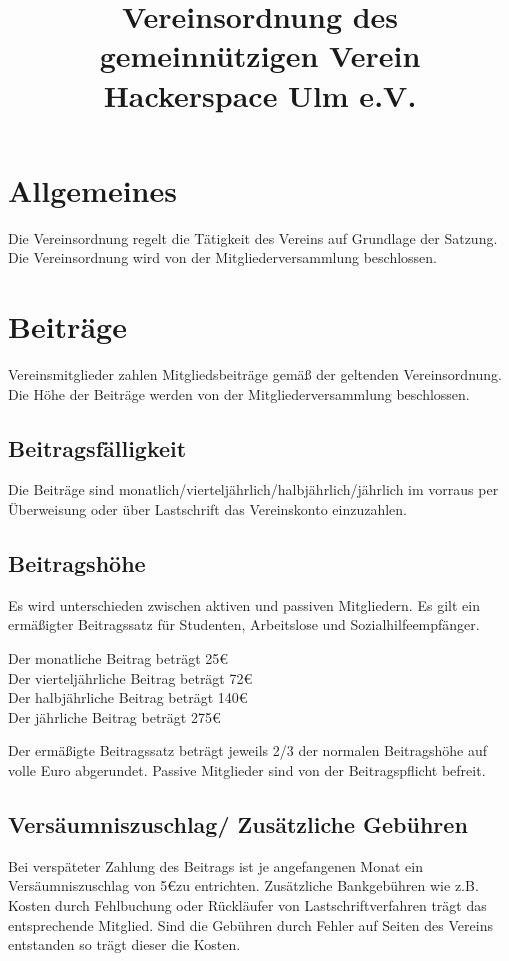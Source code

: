 \documentclass[a4paper, 12pt]{scrartcl}
\title{Vereinsordnung des gemeinnützigen Verein Hackerspace Ulm e.V. }
\author{}
\begin{document}
\maketitle
\sffamily

\section{Allgemeines}
Die Vereinsordnung regelt die Tätigkeit des Vereins auf Grundlage der Satzung. Die Vereinsordnung wird von der Mitgliederversammlung beschlossen. 

\section{Beiträge}
Vereinsmitglieder zahlen Mitgliedsbeiträge gemäß der geltenden Vereinsordnung. Die Höhe der Beiträge werden von der Mitgliederversammlung beschlossen. 
\subsection{Beitragsfälligkeit}
Die Beiträge sind monatlich/vierteljährlich/halbjährlich/jährlich im vorraus per Überweisung oder über Lastschrift das Vereinskonto einzuzahlen. 
\subsection{Beitragshöhe}
Es wird unterschieden zwischen aktiven und passiven Mitgliedern. Es gilt ein ermäßigter Beitragssatz für Studenten, Arbeitslose und Sozialhilfeempfänger. 
\begin{addmargin}[0.25in]{0cm}
Der monatliche Beitrag beträgt 25\euro{}\\
Der vierteljährliche Beitrag beträgt 72\euro{}\\
Der halbjährliche Beitrag beträgt 140\euro{} \\
Der jährliche Beitrag beträgt 275\euro{}
\end{addmargin}
Der ermäßigte Beitragssatz beträgt jeweils 2/3 der normalen Beitragshöhe auf volle Euro abgerundet. Passive Mitglieder sind von der Beitragspflicht befreit. 
\subsection{Versäumniszuschlag/ Zusätzliche Gebühren}
Bei verspäteter Zahlung des Beitrags ist je angefangenen Monat ein Versäumniszuschlag von 5\euro zu entrichten. Zusätzliche Bankgebühren wie z.B. Kosten durch Fehlbuchung oder Rückläufer von Lastschriftverfahren trägt das entsprechende Mitglied. Sind die Gebühren durch Fehler auf Seiten des Vereins entstanden so trägt dieser die Kosten. 
\end{document}
